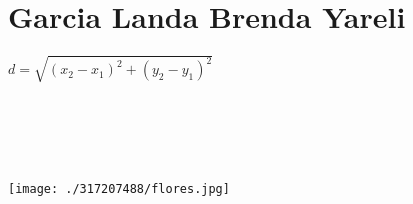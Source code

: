 \chapter{Garcia Landa Brenda Yareli}
$d = \sqrt{(x_2 - x_1)^2 + (y_2 - y_1)^2}$\\\\\\\\\\\\
\texttt{[image: ./317207488/flores.jpg]}

